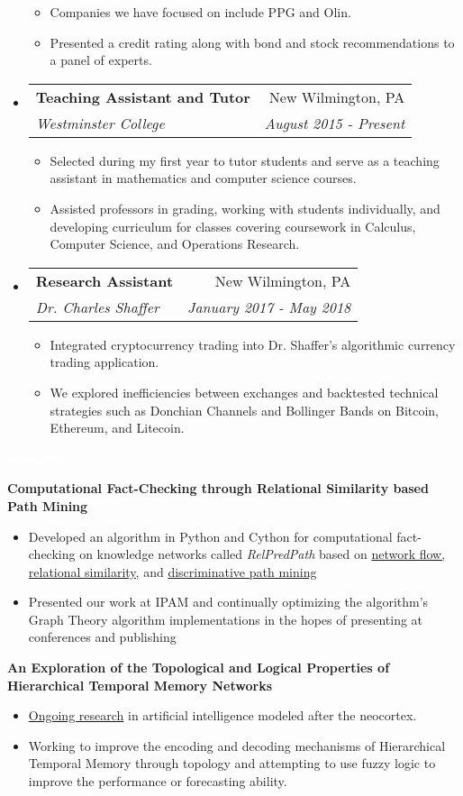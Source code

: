 \documentclass[letterpaper,11pt]{article}
\makeatletter
\newcommand{\resitem}[1]{\item #1 \vspace{-2pt}}
\newcommand{\resheading}[1]{{\large \colorbox{mypurple}{\begin{minipage}{\textwidth}{\textbf{#1 \vphantom{p\^{E}}}}\end{minipage}}}}
\newcommand{\ressubheading}[4]{
	\begin{tabular*}{7.0in}{l@{\extracolsep{\fill}}r}
		\textbf{#1} & #2 \\
		\textit{#3} & \textit{#4} \\
	\end{tabular*}\vspace{-6pt}}
\makeatother
\begin{document}
\begin{itemize}
\begin{itemize}
			\resitem{Companies we have focused on include PPG and Olin.}
			\resitem{Presented a credit rating along with bond and stock recommendations to a panel of experts.}
		\end{itemize}	
	\item
		\ressubheading{Teaching Assistant and Tutor}{New Wilmington, PA}{Westminster College}{August 2015 - Present}
		\begin{itemize}
			\resitem{Selected during my first year to tutor students and serve as a teaching assistant in mathematics and computer science courses.}
			\resitem{Assisted professors in grading, working with students individually, and developing curriculum for classes covering coursework in Calculus, Computer Science, and Operations Research.}
		\end{itemize}
		
		\item
		\ressubheading{Research Assistant}{New Wilmington, PA}{Dr. Charles Shaffer}{January 2017 - May 2018}
		\begin{itemize}
			\resitem{Integrated cryptocurrency trading into Dr. Shaffer's algorithmic currency trading application.}
			\resitem{We explored inefficiencies between exchanges and backtested technical strategies such as Donchian Channels and Bollinger Bands on Bitcoin, Ethereum, and Litecoin.}
		\end{itemize}
		
		\pagebreak
		
	\end{itemize}
	
	\resheading{\textcolor{white}{Research}}
	
		\vspace{0.1in}
		
		\textbf{Computational Fact-Checking through Relational Similarity based Path Mining}
		\begin{itemize}
			\resitem{Developed an algorithm in Python and Cython for computational fact-checking on knowledge networks called \textit{RelPredPath} based on \href{https://arxiv.org/pdf/1708.07239.pdf}{network flow, relational similarity,} and \href{https://arxiv.org/pdf/1510.05911.pdf}{discriminative path mining} }
			\resitem{Presented our work at IPAM and continually optimizing the algorithm's Graph Theory algorithm implementations in the hopes of presenting at conferences and publishing}
		\end{itemize}

		\textbf{An Exploration of the Topological and Logical Properties of Hierarchical Temporal Memory Networks}
		\begin{itemize}
			\resitem{\href{https://github.com/alexandermichels/HonorsResearch}{Ongoing research} in artificial intelligence modeled after the neocortex.}
			\resitem{Working to improve the encoding and decoding mechanisms of Hierarchical Temporal Memory through topology and attempting to use fuzzy logic to improve the performance or forecasting ability.}
		\end{itemize}
		
\end{document}
